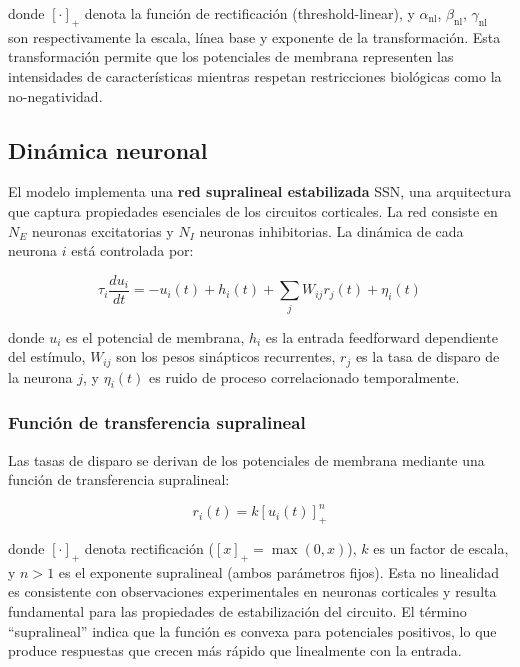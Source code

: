 donde $[\cdot]_+$ denota la función de rectificación (threshold-linear), y $\alpha_{\text{nl}}$, $\beta_{\text{nl}}$, $\gamma_{\text{nl}}$ son respectivamente la escala, línea base y exponente de la transformación. Esta transformación permite que los potenciales de membrana representen las intensidades de características mientras respetan restricciones biológicas como la no-negatividad.

\subsection{Dinámica neuronal}
\label{subsec:echeveste_dinamica}

El modelo implementa una \textbf{red supralineal estabilizada} \acrfull{SSN}, una arquitectura que captura propiedades esenciales de los circuitos corticales. La red consiste en $N_E$ neuronas excitatorias y $N_I$ neuronas inhibitorias. La dinámica de cada neurona $i$ está controlada por:

\begin{equation}
\tau_i \frac{du_i}{dt} = -u_i(t) + h_i(t) + \sum_j W_{ij} r_j(t) + \eta_i(t)
\label{eq:ssn_dynamics}
\end{equation}

donde $u_i$ es el potencial de membrana, $h_i$ es la entrada feedforward dependiente del estímulo, $W_{ij}$ son los pesos sinápticos recurrentes, $r_j$ es la tasa de disparo de la neurona $j$, y $\eta_i(t)$ es ruido de proceso correlacionado temporalmente.

\subsubsection{Función de transferencia supralineal}

Las tasas de disparo se derivan de los potenciales de membrana mediante una función de transferencia supralineal:

\begin{equation}
r_i(t) = k \left[ u_i(t) \right]_+^n
\label{eq:firing_rate}
\end{equation}

donde $[\cdot]_+$ denota rectificación ($[x]_+ = \max(0, x)$), $k$ es un factor de escala, y $n > 1$ es el exponente supralineal (ambos parámetros fijos). Esta no linealidad es consistente con observaciones experimentales en neuronas corticales y resulta fundamental para las propiedades de estabilización del circuito. El término ``supralineal'' indica que la función es convexa para potenciales positivos, lo que produce respuestas que crecen más rápido que linealmente con la entrada.

